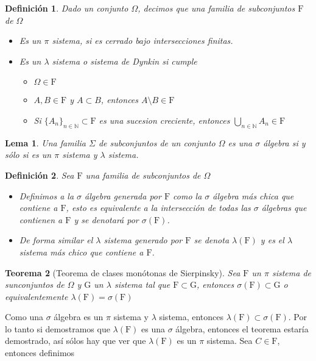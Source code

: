 \documentclass[letterpaper]{article}
\newtheorem{teorema}{Teorema}[section]
\newtheorem{lema}[teorema]{Lema}
\newtheorem{def.}{Definici\'on}[section]
\newcommand{\nat}{\ensuremath{ \mathbb N }}
\newcommand{\dem}{{\noindent \sc Demostraci\'on. }}
\newcommand{\om}{\ensuremath{\Omega}}
\begin{document}
\begin{def.}
Dado un conjunto \(\Omega\), decimos que una familia de subconjuntos \(\mathrm{F}\) de \(\Omega\)
\begin{itemize}
\item Es un \(\pi\) sistema, si es cerrado bajo intersecciones finitas.

\item Es un \(\lambda\) sistema o sistema de Dynkin si cumple
\begin{itemize}
\item \(\Omega\in\mathrm{F}\)
\item \(A,B\in\mathrm{F}\) y \(A\subset B\), entonces \(A\setminus B\in\mathrm{F}\)
\item Si \(\{A_n\}_{n\in\nat}\subset\mathrm{F}\) es una sucesion creciente, entonces \(\bigcup_{n\in\nat}A_n\in\mathrm{F}\)
\end{itemize}
\end{itemize}

\end{def.}
\begin{lema}
    Una familia $\Sigma$ de subconjuntos de un conjunto $\Omega$ es una $\sigma$ álgebra si y sólo si es un $\pi$ sistema y $\lambda$ sistema.
\end{lema}
\begin{def.}
Sea \(\mathrm{F}\) una familia de subconjuntos de \(\Omega\)
\begin{itemize}
\item Definimos a la \(\sigma\) álgebra generada por \(\mathrm{F}\) como la \(\sigma\) álgebra más chica que contiene a \(\mathrm{F}\), esto es equivalente a la intersección de todas las \(\sigma\) álgebras que contienen a \(\mathrm{F}\) y se denotará por \(\sigma(\mathrm{F})\).
\item De forma similar el \(\lambda\) sistema generado por \(\mathrm{F}\) se denota \(\lambda(\mathrm{F})\) y es el \(\lambda\) sistema más chico que contiene a \(\mathrm{F}\).
\end{itemize}
\end{def.}
\begin{teorema}[Teorema de clases monótonas de Sierpinsky]
Sea $\mathrm{F}$ un $\pi$ sistema de sunconjuntos de $\om$ y $\mathrm{G}$ un $\lambda$ sistema tal que $\mathrm{F}\subset\mathrm{G}$, entonces $\sigma(\mathrm{F})\subset\mathrm{G}$ o equivalentemente $\lambda(\mathrm{F})=\sigma(\mathrm{F})$
\end{teorema}
\noindent\dem Como una \(\sigma\) álgebra es un \(\pi\) sistema y \(\lambda\) sistema, entonces \(\lambda(\mathrm{F})\subset\sigma(\mathrm{F})\). Por lo tanto si demostramos que \(\lambda(\mathrm{F})\) es una \(\sigma\) álgebra, entonces el teorema estaría demostrado, así sólos hay que ver que \(\lambda(\mathrm{F})\) es un \(\pi\) sistema. Sea \(C\in\mathrm{F}\), entonces definimos
\end{document}
